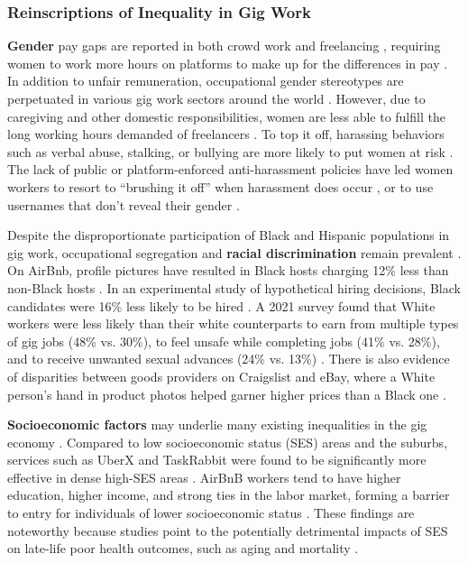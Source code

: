 \subsubsection{Reinscriptions of Inequality in Gig Work}
\textbf{Gender} pay gaps are reported in both crowd work and freelancing \cite{Dunn2021-hq,foong2021understanding,Dubey2017-fy,Litman_undated-kh}, requiring women to work more hours on platforms to make up for the differences in pay \cite{Barzilay2016-yl}. In addition to unfair remuneration, occupational gender stereotypes are perpetuated in various gig work sectors around the world \cite{Galperin2021-eh,good}. However, due to caregiving and other domestic responsibilities, women are less able to fulfill the long working hours demanded of freelancers \cite{Adams-Prassl2017-co}. To top it off, harassing behaviors such as verbal abuse, stalking, or bullying are more likely to put women at risk \cite{Rosenblat2017-bm}. The lack of public or platform-enforced anti-harassment policies have led women workers to resort to ``brushing it off'' when harassment does occur \cite{Ma2022-ba}, or to use usernames that don't reveal their gender \cite{Kasliwal2020-zg}.

Despite the disproportionate participation of Black and Hispanic populations in gig work, occupational segregation and \textbf{racial discrimination} remain prevalent \cite{England_undated-gk}. On AirBnb, profile pictures have resulted in Black hosts charging 12\% less than non-Black hosts \cite{edelman2014digital}. In an experimental study of hypothetical hiring decisions, Black candidates were 16\% less likely to be hired \cite{Leung2020-rk}. A 2021 survey found that White workers were less likely than their white counterparts to earn from multiple types of gig jobs (48\% vs. 30\%), to feel unsafe while completing jobs (41\% vs. 28\%), and to receive unwanted sexual advances (24\% vs. 13\%) \cite{Gelles-Watnick2021-fz}. There is also evidence of disparities between goods providers on Craigslist and eBay, where a White person's hand in product photos helped garner higher prices than a Black one \cite{Rosenblat2017-bm}.

\textbf{Socioeconomic factors} may underlie many existing inequalities in the gig economy \cite{Shaw2022-ai}. Compared to low socioeconomic status (SES) areas and the suburbs, services such as UberX and TaskRabbit were found to be significantly more effective in dense high-SES areas \cite{Thebault-Spieker2017-bv}. AirBnB workers tend to have higher education, higher income, and strong ties in the labor market, forming a barrier to entry for individuals of lower socioeconomic status \cite{Ilsoe_undated-mr}. These findings are noteworthy because studies point to the potentially detrimental impacts of SES on late-life poor health outcomes, such as aging and mortality \cite{Freni-Sterrantino2021-fq,Pathak2022-ah}.

